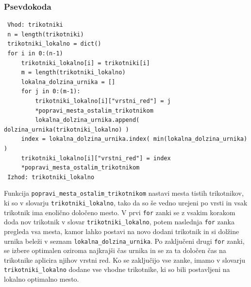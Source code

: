 \documentclass[a4paper,12pt]{article}
\theoremstyle{definition}
\theoremstyle{plain}
\begin{document}
\subsubsection{Psevdokoda}
\begin{verbatim}
 Vhod: trikotniki
 n = length(trikotniki)
 trikotniki_lokalno = dict()
 for i in 0:(n-1)
     trikotniki_lokalno[i] = trikotniki[i]
     m = length(trikotniki_lokalno)
     lokalna_dolzina_urnika = []
     for j in 0:(m-1):
         trikotniki_lokalno[i]["vrstni_red"] = j
         *popravi_mesta_ostalim_trikotnikom
         lokalna_dolzina_urnika.append( dolzina_urnika(trikotniki_lokalno) )
     index = lokalna_dolzina_urnika.index( min(lokalna_dolzina_urnika) )
     trikotniki_lokalno[i]["vrstni_red"] = index
     *popravi_mesta_ostalim_trikotnikom
 Izhod: trikotniki_lokalno

\end{verbatim}


Funkcija \texttt{popravi\_mesta\_ostalim\_trikotnikom} nastavi mesta tistih trikotnikov, ki so v slovarju \texttt{trikotniki\_lokalno}, tako da so še vedno urejeni po vrsti in vsak trikotnik ima enolično določeno mesto.
V prvi \texttt{for} zanki se z vsakim korakom doda nov trikotnik v slovar \texttt{trikotniki\_lokalno}, potem naslednja \texttt{for} zanka pregleda vsa mesta, kamor lahko postavi na novo dodani trikotnik in si dolžine urnika beleži v seznam \texttt{lokalna\_dolzina\_urnika}. Po zaključeni drugi \texttt{for} zanki, se izbere optimalen oziroma najkrajši čas urnika in se za ta določen čas na trikotnike aplicira njihov vrstni red.
Ko se zaključijo vse zanke, imamo v slovarju \texttt{trikotniki\_lokalno} dodane vse vhodne trikotnike, ki so bili postavljeni na lokalno optimalno mesto.


\end{document}
